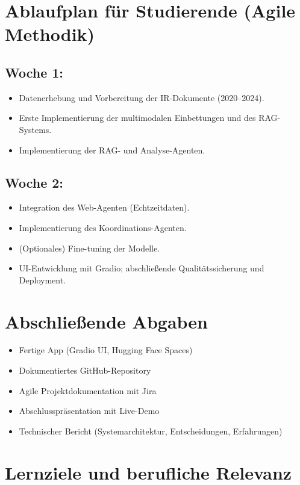 \documentclass[12pt,a4paper]{article}
\begin{document}
\section*{Ablaufplan für Studierende (Agile Methodik)}

\subsection*{Woche 1:}
\begin{itemize}[noitemsep]
    \item Datenerhebung und Vorbereitung der IR-Dokumente (2020–2024).
    \item Erste Implementierung der multimodalen Einbettungen und des RAG-Systems.
    \item Implementierung der RAG- und Analyse-Agenten.
\end{itemize}

\subsection*{Woche 2:}
\begin{itemize}[noitemsep]
    \item Integration des Web-Agenten (Echtzeitdaten).
    \item Implementierung des Koordinations-Agenten.
    \item (Optionales) Fine-tuning der Modelle.
    \item UI-Entwicklung mit Gradio; abschließende Qualitätssicherung und Deployment.
\end{itemize}

\section*{Abschließende Abgaben}
\begin{itemize}[noitemsep]
    \item Fertige App (Gradio UI, Hugging Face Spaces)
    \item Dokumentiertes GitHub-Repository
    \item Agile Projektdokumentation mit Jira
    \item Abschlusspräsentation mit Live-Demo
    \item Technischer Bericht (Systemarchitektur, Entscheidungen, Erfahrungen)
\end{itemize}

\section*{Lernziele und berufliche Relevanz}
\end{document}
